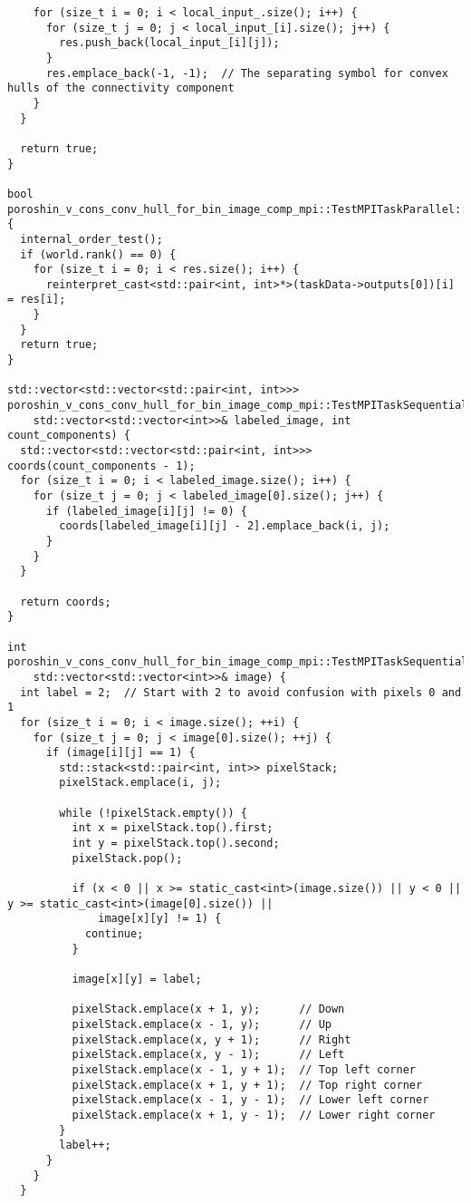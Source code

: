\documentclass[12pt]{article}
\begin{document}
\begin{verbatim}
    for (size_t i = 0; i < local_input_.size(); i++) {
      for (size_t j = 0; j < local_input_[i].size(); j++) {
        res.push_back(local_input_[i][j]);
      }
      res.emplace_back(-1, -1);  // The separating symbol for convex hulls of the connectivity component
    }
  }

  return true;
}

bool poroshin_v_cons_conv_hull_for_bin_image_comp_mpi::TestMPITaskParallel::post_processing() {
  internal_order_test();
  if (world.rank() == 0) {
    for (size_t i = 0; i < res.size(); i++) {
      reinterpret_cast<std::pair<int, int>*>(taskData->outputs[0])[i] = res[i];
    }
  }
  return true;
}

std::vector<std::vector<std::pair<int, int>>>
poroshin_v_cons_conv_hull_for_bin_image_comp_mpi::TestMPITaskSequential::coordinates_connected_components(
    std::vector<std::vector<int>>& labeled_image, int count_components) {
  std::vector<std::vector<std::pair<int, int>>> coords(count_components - 1);
  for (size_t i = 0; i < labeled_image.size(); i++) {
    for (size_t j = 0; j < labeled_image[0].size(); j++) {
      if (labeled_image[i][j] != 0) {
        coords[labeled_image[i][j] - 2].emplace_back(i, j);
      }
    }
  }

  return coords;
}

int poroshin_v_cons_conv_hull_for_bin_image_comp_mpi::TestMPITaskSequential::label_connected_components(
    std::vector<std::vector<int>>& image) {
  int label = 2;  // Start with 2 to avoid confusion with pixels 0 and 1
  for (size_t i = 0; i < image.size(); ++i) {
    for (size_t j = 0; j < image[0].size(); ++j) {
      if (image[i][j] == 1) {
        std::stack<std::pair<int, int>> pixelStack;
        pixelStack.emplace(i, j);

        while (!pixelStack.empty()) {
          int x = pixelStack.top().first;
          int y = pixelStack.top().second;
          pixelStack.pop();

          if (x < 0 || x >= static_cast<int>(image.size()) || y < 0 || y >= static_cast<int>(image[0].size()) ||
              image[x][y] != 1) {
            continue;
          }

          image[x][y] = label;

          pixelStack.emplace(x + 1, y);      // Down
          pixelStack.emplace(x - 1, y);      // Up
          pixelStack.emplace(x, y + 1);      // Right
          pixelStack.emplace(x, y - 1);      // Left
          pixelStack.emplace(x - 1, y + 1);  // Top left corner
          pixelStack.emplace(x + 1, y + 1);  // Top right corner
          pixelStack.emplace(x - 1, y - 1);  // Lower left corner
          pixelStack.emplace(x + 1, y - 1);  // Lower right corner
        }
        label++;
      }
    }
  }


\end{verbatim}
\end{document}
